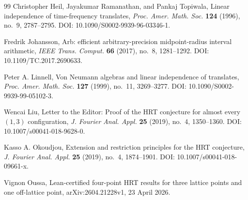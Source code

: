 \documentclass[11pt]{amsart}
\theoremstyle{remark}
\begin{document}
\begin{thebibliography}{99}
Christopher Heil, Jayakumar Ramanathan, and Pankaj Topiwala,
\newblock Linear independence of time-frequency translates,
\newblock \emph{Proc. Amer. Math. Soc.} \textbf{124} (1996), no.~9,
2787--2795.
\newblock DOI: 10.1090/S0002-9939-96-03346-1.

Fredrik Johansson,
\newblock Arb: efficient arbitrary-precision midpoint-radius interval
arithmetic,
\newblock \emph{IEEE Trans. Comput.} \textbf{66} (2017), no.~8, 1281--1292.
\newblock DOI: 10.1109/TC.2017.2690633.

Peter A. Linnell,
\newblock Von Neumann algebras and linear independence of translates,
\newblock \emph{Proc. Amer. Math. Soc.} \textbf{127} (1999), no.~11,
3269--3277.
\newblock DOI: 10.1090/S0002-9939-99-05102-3.

Wencai Liu,
\newblock Letter to the Editor: Proof of the HRT conjecture for almost every
$(1,3)$ configuration,
\newblock \emph{J. Fourier Anal. Appl.} \textbf{25} (2019), no.~4,
1350--1360.
\newblock DOI: 10.1007/s00041-018-9628-0.

Kasso A. Okoudjou,
\newblock Extension and restriction principles for the HRT conjecture,
\newblock \emph{J. Fourier Anal. Appl.} \textbf{25} (2019), no.~4,
1874--1901.
\newblock DOI: 10.1007/s00041-018-09661-x.

Vignon Oussa,
\newblock Lean-certified four-point HRT results for three lattice points and
one off-lattice point,
\newblock arXiv:2604.21228v1, 23 April 2026.

\end{thebibliography}
\end{document}
